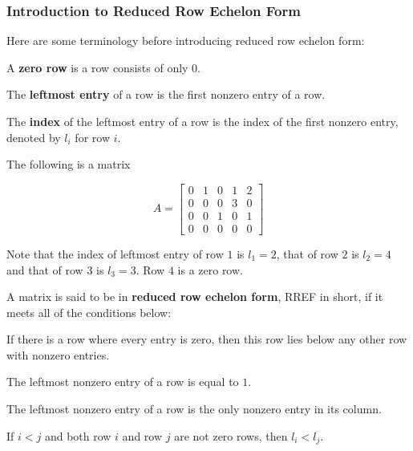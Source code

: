\documentclass[a4paper,12pt]{article}
\begin{document}
\subsubsection{Introduction to Reduced Row Echelon Form}
Here are some terminology before introducing reduced row echelon form:\n

\begin{dft}
  \begin{alist}
    \item A \textbf{zero row} is a row consists of only $0$.
    \item The \textbf{leftmost entry} of a row is the first nonzero entry of a row.
    \item The \textbf{index} of the leftmost entry of a row is the index of the first nonzero entry, denoted by $l_{i}$ for row $i$.
  \end{alist}
\end{dft}\n

\begin{exm}
  The following is a matrix

  $$A=\begin{bmatrix}
  0 & 1 & 0 & 1 & 2\\
  0 & 0 & 0 & 3 & 0\\
  0 & 0 & 1 & 0 & 1\\
  0 & 0 & 0 & 0 & 0
  \end{bmatrix}$$\s

  Note that the index of leftmost entry of row $1$ is $l_{1}=2$, that of row $2$ is $l_{2}=4$ and that of row $3$ is $l_{3}=3$. Row $4$ is a zero row.
\end{exm}\n

\begin{dft}
  A matrix is said to be in \textbf{reduced row echelon form}, RREF in short, if it meets all of the conditions below:

  \begin{alist}
    \item If there is a row where every entry is zero, then this row lies below any other row with nonzero entries.
    \item The leftmost nonzero entry of a row is equal to $1$.
    \item The leftmost nonzero entry of a row is the only nonzero entry in its column.
    \item If $i<j$ and both row $i$ and row $j$ are not zero rows, then $l_{i}<l_{j}$.
  \end{alist}
\end{dft}\n
\end{document}
